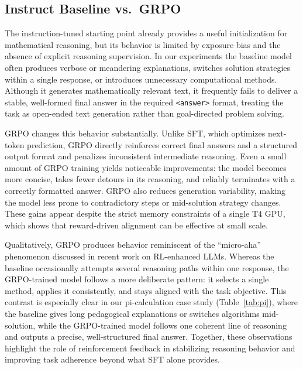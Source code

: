 \documentclass{article}
\begin{document}
\subsection{Instruct Baseline vs.\ GRPO}

The instruction-tuned starting point already provides a useful initialization for mathematical reasoning, but its behavior is limited by exposure bias and the absence of explicit reasoning supervision. In our experiments the baseline model often produces verbose or meandering explanations, switches solution strategies within a single response, or introduces unnecessary computational methods. Although it generates mathematically relevant text, it frequently fails to deliver a stable, well-formed final answer in the required \texttt{<answer>} format, treating the task as open-ended text generation rather than goal-directed problem solving.

GRPO changes this behavior substantially. Unlike SFT, which optimizes next-token prediction, GRPO directly reinforces correct final answers and a structured output format and penalizes inconsistent intermediate reasoning. Even a small amount of GRPO training yields noticeable improvements: the model becomes more concise, takes fewer detours in its reasoning, and reliably terminates with a correctly formatted answer. GRPO also reduces generation variability, making the model less prone to contradictory steps or mid-solution strategy changes. These gains appear despite the strict memory constraints of a single T4 GPU, which shows that reward-driven alignment can be effective at small scale.

Qualitatively, GRPO produces behavior reminiscent of the ``micro-aha'' phenomenon discussed in recent work on RL-enhanced LLMs. Whereas the baseline occasionally attempts several reasoning paths within one response, the GRPO-trained model follows a more deliberate pattern: it selects a single method, applies it consistently, and stays aligned with the task objective. This contrast is especially clear in our pi-calculation case study (Table~\ref{tab:pi}), where the baseline gives long pedagogical explanations or switches algorithms mid-solution, while the GRPO-trained model follows one coherent line of reasoning and outputs a precise, well-structured final answer. Together, these observations highlight the role of reinforcement feedback in stabilizing reasoning behavior and improving task adherence beyond what SFT alone provides.
\end{document}
